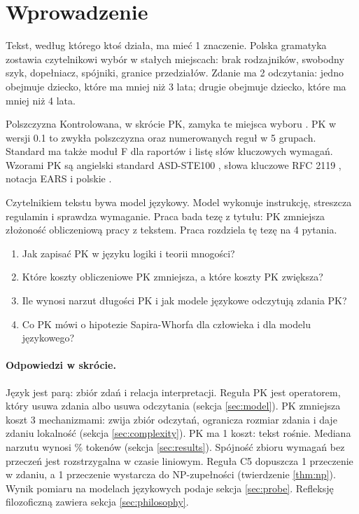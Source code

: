 \section{Wprowadzenie}

Tekst, według którego ktoś działa, ma mieć 1 znaczenie. Polska gramatyka zostawia
czytelnikowi wybór w stałych miejscach: brak rodzajników, swobodny szyk, dopełniacz,
spójniki, granice przedziałów. Zdanie  ma
2 odczytania: jedno obejmuje dziecko, które ma mniej niż 3 lata; drugie obejmuje dziecko,
które ma mniej niż 4 lata.

Polszczyzna Kontrolowana, w skrócie PK, zamyka te miejsca wyboru \cite{pk}. PK w wersji 0.1
to zwykła polszczyzna oraz \pkRules{} numerowanych reguł w 5 grupach. Standard ma także
moduł F dla raportów i listę słów kluczowych wymagań. Wzorami PK są angielski standard
ASD-STE100 \cite{ste}, słowa kluczowe RFC 2119 \cite{rfc2119}, notacja EARS \cite{ears}
i polskie  \cite{ztp}.

Czytelnikiem tekstu bywa model językowy. Model wykonuje instrukcję, streszcza
regulamin i sprawdza wymaganie. Praca bada tezę z tytułu: PK zmniejsza złożoność
obliczeniową pracy z tekstem. Praca rozdziela tę tezę na 4 pytania.
\begin{enumerate}[label=(\roman*),leftmargin=2.4em]
  \item Jak zapisać PK w języku logiki i teorii mnogości?
  \item Które koszty obliczeniowe PK zmniejsza, a które koszty PK zwiększa?
  \item Ile wynosi narzut długości PK i jak modele językowe odczytują zdania PK?
  \item Co PK mówi o hipotezie Sapira-Whorfa dla człowieka i dla modelu językowego?
\end{enumerate}

\paragraph{Odpowiedzi w skrócie.}
Język jest parą: zbiór zdań i relacja interpretacji. Reguła PK jest operatorem, który usuwa
zdania albo usuwa odczytania (sekcja \ref{sec:model}). PK zmniejsza koszt 3 mechanizmami:
zwija zbiór odczytań, ogranicza rozmiar zdania i daje zdaniu lokalność
(sekcja \ref{sec:complexity}). PK ma 1 koszt: tekst rośnie. Mediana narzutu wynosi
\pkTokMedian{} \% tokenów (sekcja \ref{sec:results}). Spójność zbioru wymagań bez przeczeń
jest rozstrzygalna w czasie liniowym. Reguła C5 dopuszcza 1 przeczenie w zdaniu, a 1
przeczenie wystarcza do NP-zupełności (twierdzenie \ref{thm:np}). Wynik pomiaru na
modelach językowych podaje sekcja \ref{sec:probe}. Refleksję filozoficzną zawiera
sekcja \ref{sec:philosophy}.

